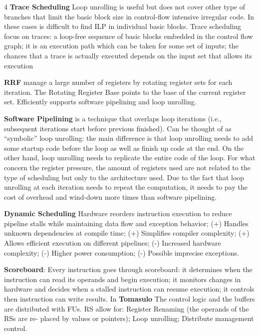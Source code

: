 \documentclass[a4paper,landscape]{article}
\begin{document}
\begin{multicols}{4}
\noindent \textbf{Trace Scheduling} Loop unrolling is useful but does not cover other type of branches that limit the basic block size in control-flow intensive irregular code. In these cases is difficult to find ILP in individual basic blocks.
Trace scheduling focus on traces: a loop-free sequence of basic blocks embedded in the control flow graph; it is an execution path which can be taken for some set of inputs; the chances that a trace is actually executed depends on the input set that allows its execution


\noindent \textbf{RRF} manage a large number of registers by rotating register sets for each iteration. The Rotating Register Base points to the base of the current register set. Efficiently supports software pipelining and loop unrolling.

\noindent \textbf{Software Pipelining} is a technique that overlaps loop iterations (i.e., subsequent iterations start before previous finished). Can be thought of as “symbolic” loop unrolling: the main difference is that loop unrolling needs to add some startup code before the loop as well as finish up code at the end. On the other hand, loop unrolling needs to replicate the entire code of the loop. For what concern the register pressure, the amount of registers used are not related to the type of scheduling but only to the architecture used. Due to the fact that loop unrolling at each iteration needs to repeat the computation, it needs to pay the cost of overhead and wind-down more times than software pipelining.

\noindent \textbf{Dynamic Scheduling}
Hardware reorders instruction execution to reduce pipeline stalls while maintaining data flow and exception behavior; (+) Handles unknown dependencies at compile time; (+) Simplifies compiler complexity; (+) Allows efficient execution on different pipelines; (-) Increased hardware complexity; (-) Higher power consumption; (-) Possible imprecise exceptions.

\noindent\textbf{Scoreboard}: Every instruction goes through scoreboard: it determines when the instruction can read its operands and begin execution; it monitors changes in hardware and decides when a stalled instruction can resume execution; it controls then instruction can write results. In \textbf{Tomasulo} The control logic and the buffers are distributed with FUs. RS allow for: Register Renaming (the operands of the RSs are re- placed by values or pointers); Loop unrolling; Distribute management control.


\end{multicols}
\end{document}

